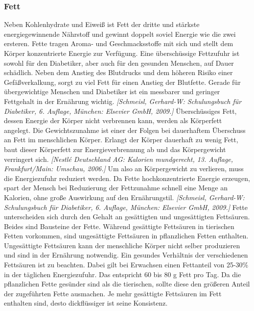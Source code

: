 \documentclass[a4paper,11pt]{article}%
\renewcommand{\\}{\vspace*{0.5\baselineskip} \newline}
\begin{document}
	\subsubsection{Fett}
		Neben Kohlenhydrate und Eiweiß ist Fett der dritte und stärkste energiegewinnende Nährstoff und gewinnt doppelt soviel Energie wie die zwei ersteren. Fette tragen Aroma- und Geschmacksstoffe mit sich und stellt dem Körper konzentrierte Energie zur Verfügung. Eine überschüssige Fettzufuhr ist sowohl für den Diabetiker, aber auch für den gesunden Menschen, auf Dauer schädlich. Neben dem Anstieg des Blutdrucks und dem höheren Risiko einer Gefäßverkalkung, sorgt zu viel Fett für einen Anstieg der Blutfette. Gerade für übergewichtige Menschen und Diabetiker ist ein messbarer und geringer Fettgehalt in der Ernährung wichtig. \emph{[Schmeisl, Gerhard-W: Schulungsbuch für Diabetiker, 6. Auflage, München: Elsevier GmbH, 2009.]} 
		Überschüssiges Fett, dessen Energie der Körper nicht verbrennen kann, werden als Körperfett angelegt. Die Gewichtszunahme ist einer der Folgen bei dauerhaftem Überschuss an Fett im menschlichen Körper. Erlangt der Körper dauerhaft zu wenig Fett, baut dieser Körperfett zur Energieverbrennung ab und das Körpergewicht verringert sich. \emph{[Nestlé Deutschland AG: Kalorien mundgerecht, 13. Auflage, Frankfurt/Main: Umschau, 2006.]} 
		Um also an Körpergewicht zu verlieren, muss die Energiezufuhr reduziert werden. Da Fette hochkonzentrierte Energie erzeugen, spart der Mensch bei Reduzierung der Fettzunahme schnell eine Menge an Kalorien, ohne große Auswirkung auf den Ernährungstil. \emph{[Schmeisl, Gerhard-W: Schulungsbuch für Diabetiker, 6. Auflage, München: Elsevier GmbH, 2009.]} \newline
		Fette unterscheiden sich durch den Gehalt an gesättigten und ungesättigten Fettsäuren. Beides sind Bausteine der Fette. Während gesättigte Fettsäuren in tierischen Fetten vorkommen, sind ungesättigte Fettsäuren in pflanzlichen Fetten enthalten. Ungesättigte Fettsäuren kann der menschliche Körper nicht selber produzieren und sind in der Ernährung notwendig. Ein gesundes Verhältnis der verschiedenen Fettsäuren ist zu beachten. Dabei gilt bei Erwachsen einen Fettanteil von 25-30\% in der täglichen Energiezufuhr. Das entspricht 60 bis 80 g Fett pro Tag. Da die pflanzlichen Fette gesünder sind als die tierischen, sollte diese den größeren Anteil der zugeführten Fette ausmachen. Je mehr gesättigte Fettsäuren im Fett enthalten sind, desto dickflüssiger ist seine Konsistenz. \newline
\end{document}
